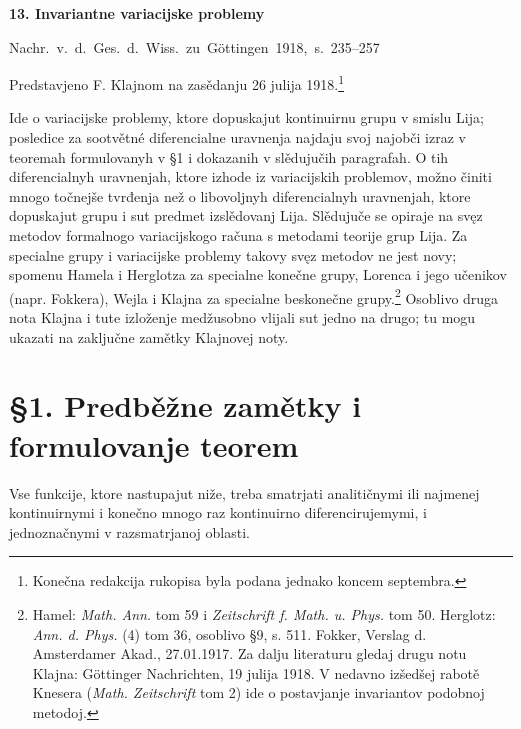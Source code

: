 \documentclass[11pt]{article}
\begin{document}

\begin{center}
{\Large\bfseries 13. Invariantne variacijske problemy}\par
\vspace{1.5em}
\mbox{Nachr. v. d. Ges. d. Wiss. zu Göttingen 1918, s. 235--257}
\end{center}

\vspace{3em}
\begin{center}
Predstavjeno F. Klajnom na zasědanju 26 julija 1918.\footnote{Konečna redakcija rukopisa byla podana jednako koncem septembra.}
\end{center}

Ide o variacijske problemy, ktore dopuskajut kontinuirnu grupu v smislu Lija; posledice za sootvětné diferencialne uravnenja najdaju svoj najobči izraz v teoremah formulovanyh v \S{}1 i dokazanih v slědujučih paragrafah. O tih diferencialnyh uravnenjah, ktore izhode iz variacijskih problemov, možno činiti mnogo točnejše tvrđenja než o libovoljnyh diferencialnyh uravnenjah, ktore dopuskajut grupu i sut predmet izslědovanj Lija. Slědujuče se opiraje na svęz metodov formalnogo variacijskogo računa s metodami teorije grup Lija. Za specialne grupy i variacijske problemy takovy svęz metodov ne jest novy; spomenu Hamela i Herglotza za specialne konečne grupy, Lorenca i jego učenikov (napr. Fokkera), Wejla i Klajna za specialne beskonečne grupy.\footnote{Hamel: \emph{Math. Ann.} tom 59 i \emph{Zeitschrift f. Math. u. Phys.} tom 50. Herglotz: \emph{Ann. d. Phys.} (4) tom 36, osoblivo \S{}9, s. 511. Fokker, Verslag d. Amsterdamer Akad., 27.01.1917. Za dalju literaturu gledaj drugu notu Klajna: Göttinger Nachrichten, 19 julija 1918. V nedavno izšedšej rabotě Knesera (\emph{Math. Zeitschrift} tom 2) ide o postavjanje invariantov podobnoj metodoj.} Osoblivo druga nota Klajna i tute izloženje medžusobno vlijali sut jedno na drugo; tu mogu ukazati na zaključne zamětky Klajnovej noty.

\section*{\S{}1. Predběžne zamětky i formulovanje teorem}

Vse funkcije, ktore nastupajut niže, treba smatrjati analitičnymi ili najmenej kontinuirnymi i konečno mnogo raz kontinuirno diferencirujemymi, i jednoznačnymi v razsmatrjanoj oblasti.
\end{document}
